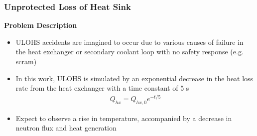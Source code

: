\begin{frame}
	\frametitle{Unprotected Loss of Heat Sink}
		\textbf{Problem Description}
			\begin{itemize}
				\item \gls{ULOHS} accidents are imagined to occur due to various
				causes of failure in the heat exchanger or secondary coolant
				loop with no safety response (e.g. scram)
				\item In this work, \gls{ULOHS} is simulated by an exponential
				decrease in the heat loss rate from the heat exchanger with a
				time constant of 5 s
					\begin{align*}
						Q_{hx} = Q_{hx,0} e^{-t/5}
					\end{align*}
				\item Expect to observe a rise in temperature, accompanied by a
				decrease in neutron flux and heat generation
			\end{itemize}
\end{frame}

